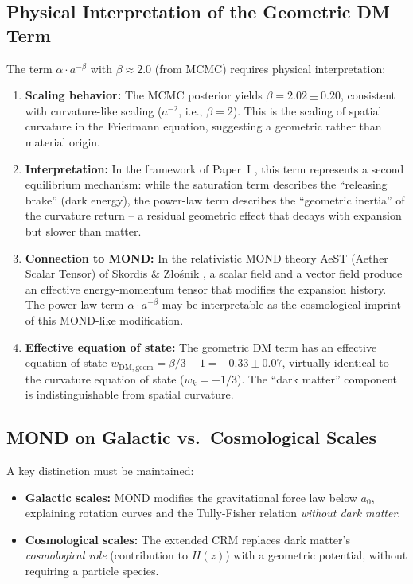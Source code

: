 \documentclass[aps,prd,twocolumn,superscriptaddress,nofootinbib,floatfix]{revtex4-2}
\begin{document}
\subsection{Physical Interpretation of the Geometric DM Term}

The term $\alpha \cdot a^{-\beta}$ with $\beta \approx 2.0$ (from MCMC) requires physical interpretation:

\begin{enumerate}
\item \textbf{Scaling behavior:} The MCMC posterior yields $\beta = 2.02 \pm 0.20$, consistent with curvature-like scaling ($a^{-2}$, i.e., $\beta = 2$). This is the scaling of spatial curvature in the Friedmann equation, suggesting a geometric rather than material origin.

\item \textbf{Interpretation:} In the framework of Paper~I \cite{Geiger2026}, this term represents a second equilibrium mechanism: while the saturation term describes the ``releasing brake'' (dark energy), the power-law term describes the ``geometric inertia'' of the curvature return -- a residual geometric effect that decays with expansion but slower than matter.

\item \textbf{Connection to MOND:} In the relativistic MOND theory AeST (Aether Scalar Tensor) of Skordis \& Z{\l}o\'snik \cite{Skordis2021}, a scalar field and a vector field produce an effective energy-momentum tensor that modifies the expansion history. The power-law term $\alpha \cdot a^{-\beta}$ may be interpretable as the cosmological imprint of this MOND-like modification.

\item \textbf{Effective equation of state:} The geometric DM term has an effective equation of state $w_{\mathrm{DM,geom}} = \beta/3 - 1 = -0.33 \pm 0.07$, virtually identical to the curvature equation of state ($w_k = -1/3$). The ``dark matter'' component is indistinguishable from spatial curvature.
\end{enumerate}

\subsection{MOND on Galactic vs.\ Cosmological Scales}

A key distinction must be maintained:
\begin{itemize}
\item \textbf{Galactic scales:} MOND modifies the gravitational force law below $a_0$, explaining rotation curves and the Tully-Fisher relation \textit{without dark matter}.
\item \textbf{Cosmological scales:} The extended CRM replaces dark matter's \textit{cosmological role} (contribution to $H(z)$) with a geometric potential, without requiring a particle species.
\end{itemize}
\end{document}
